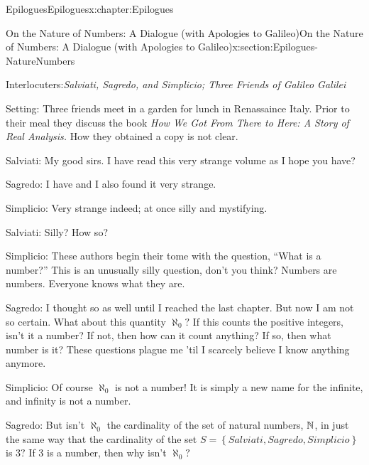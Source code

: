 
\typeout{************************************************}
\typeout{************************************************}
%
\begin{chapterptx}{Epilogues}{}{Epilogues}{}{}{x:chapter:Epilogues}
	\typeout{************************************************}
	\typeout{************************************************}
	\begin{sectionptx}{On the Nature of Numbers: A Dialogue (with Apologies to Galileo)}{}{On the Nature of Numbers: A Dialogue (with Apologies to Galileo)}{}{}{x:section:Epilogues-NatureNumbers}
		\begin{introduction}{}%
			\alert{Interlocuters}:\emph{Salviati, Sagredo, and Simplicio; Three Friends of Galileo Galilei}%
			\par
			\alert{Setting}: Three friends meet in a garden for lunch in Renassaince Italy.  Prior to their meal they discuss the book \emph{How We Got From There to Here: A Story of Real Analysis.} How they obtained a copy is not clear.%
			\par
			\alert{Salviati}: My good sirs. I have read this very strange volume as I hope you have?%
			\par
			\alert{Sagredo}: I have and I also found it very strange.%
			\par
			\alert{Simplicio}: Very strange indeed; at once silly and mystifying.%
			\par
			\alert{Salviati}: Silly? How so?%
			\par
			\alert{Simplicio}: These authors begin their tome with the question, ``What is a number?'' This is an unusually silly question, don't you think? Numbers are numbers. Everyone knows what they are.%
			\par
			\alert{Sagredo}: I thought so as well until I reached the last chapter. But now I am not so certain. What about this quantity \(\aleph_0?\) If this counts the positive integers, isn't it a number? If not, then how can it count anything? If so, then what number is it? These questions plague me 'til I scarcely believe I know anything anymore.%
			\par
			\alert{Simplicio}: Of course \(\aleph_0\) is not a number! It is simply a new name for the infinite, and infinity is not a number.%
			\par
			\alert{Sagredo}: But isn't \(\aleph_0\) the cardinality of the set of natural numbers, \(\mathbb {N}\), in just the same way that the cardinality of the set \(S=\left\{Salviati, Sagredo, Simplicio\right\}\) is \(3?\) If \(3\) is a number, then why isn't \(\aleph_0?\)%

\end{introduction}
\end{sectionptx}
\end{chapterptx}

